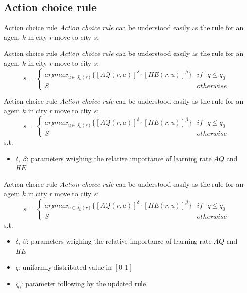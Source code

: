 \documentclass[aspectratio=169,xcolor=dvipsnames]{beamer}
\begin{document}
\subsection{Action choice rule}
\begin{frame}{Action choice rule}
    \textit{Action choice rule} can be understood easily as the rule for an agent $k$ in city $r$ move to city $s$:
\end{frame}

\begin{frame}{Action choice rule}
    \textit{Action choice rule} can be understood easily as the rule for an agent $k$ in city $r$ move to city $s$:
    \begin{equation*}
        s = \begin{cases}argmax_{u\in J_{k}(r)}\{\left[ AQ(r, u)\right]^\delta \cdot\left[HE(r, u)\right]^\beta\}&if\text{ } q\leq q_0\\S&otherwise\end{cases}
    \end{equation*}
\end{frame}

\begin{frame}{Action choice rule}
    \textit{Action choice rule} can be understood easily as the rule for an agent $k$ in city $r$ move to city $s$:
    \begin{equation*}
        s = \begin{cases}argmax_{u\in J_{k}(r)}\{\left[ AQ(r, u)\right]^\delta \cdot\left[HE(r, u)\right]^\beta\}&if\text{ } q\leq q_0\\S&otherwise\end{cases}
    \end{equation*}
    s.t.
    \begin{itemize}
        \item $\delta$, $\beta$: parameters weighing the relative importance of learning rate $AQ$ and $HE$
    \end{itemize}
\end{frame}

\begin{frame}{Action choice rule}
    \textit{Action choice rule} can be understood easily as the rule for an agent $k$ in city $r$ move to city $s$:
    \begin{equation*}
        s = \begin{cases}argmax_{u\in J_{k}(r)}\{\left[ AQ(r, u)\right]^\delta \cdot\left[HE(r, u)\right]^\beta\}&if\text{ } q\leq q_0\\S&otherwise\end{cases}
    \end{equation*}
    s.t.
    \begin{itemize}
        \item $\delta$, $\beta$: parameters weighing the relative importance of learning rate $AQ$ and $HE$
        \item $q$: uniformly distributed value in $\left[ 0; 1\right]$
        \item $q_0$: parameter following by the updated rule
    \end{itemize}
\end{frame}
\end{document}
